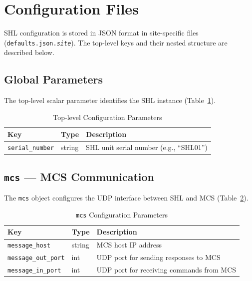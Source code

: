 \section{Configuration Files}
\label{sec:configuration}

SHL configuration is stored in JSON format in site-specific files
(\texttt{defaults.json.\textit{site}}).  The top-level keys and their
nested structure are described below.

\subsection{Global Parameters}

The top-level scalar parameter identifies the SHL instance (Table~\ref{tab:config-global}).

\begin{table}[htbp]
    \centering
    \caption{Top-level Configuration Parameters}
    \label{tab:config-global}
    \begin{tabular}{llp{7cm}}
        \toprule
        \textbf{Key} & \textbf{Type} & \textbf{Description} \\
        \midrule
        \texttt{serial\_number} & string & SHL unit serial number (e.g., ``SHL01'') \\
        \bottomrule
    \end{tabular}
\end{table}

\subsection{\texttt{mcs} --- MCS Communication}

The \texttt{mcs} object configures the UDP interface between SHL and MCS (Table~\ref{tab:config-mcs}).

\begin{table}[htbp]
    \centering
    \caption{\texttt{mcs} Configuration Parameters}
    \label{tab:config-mcs}
    \begin{tabular}{llp{7cm}}
        \toprule
        \textbf{Key} & \textbf{Type} & \textbf{Description} \\
        \midrule
        \texttt{message\_host}     & string & MCS host IP address \\
        \texttt{message\_out\_port} & int   & UDP port for sending responses to MCS \\
        \texttt{message\_in\_port}  & int   & UDP port for receiving commands from MCS \\
        \bottomrule
    \end{tabular}
\end{table}

